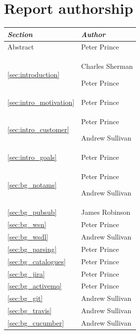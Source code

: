 \documentclass[a4paper, 12pt, twoside]{article}
\newcommand*{\fullref}[1]{\ref{#1} \nameref{#1}}
\begin{document}
\newpage

\sloppy
\printbibliography

\appendix

\section{Report authorship}

\begin{tabularx}{\textwidth}{|X|X|} \hline
  \emph{Section}                         & \emph{Author}                      \\ \hline
  Abstract         & Peter Prince                       \\ \hline
  \fullref{sec:introduction}             & Charles Sherman\par Peter Prince   \\ \hline
  \fullref{sec:intro_motivation}         & Peter Prince                       \\
  \fullref{sec:intro_customer}           & Peter Prince\par Andrew Sullivan  \\
  \fullref{sec:intro_goals}              & Peter Prince                       \\ \hline
  \fullref{sec:bg_notams}                & Peter Prince\par Andrew Sullivan   \\
  \fullref{sec:bg_pubsub}                & James Robinson                     \\
  \fullref{sec:bg_wsn}                   & Peter Prince                       \\
  \fullref{sec:bg_wsdl}						& Andrew Sullivan 				\\
  \fullref{sec:bg_parsing}               & Peter Prince                       \\
  \fullref{sec:bg_catalogues}            & Peter Prince                       \\
  \fullref{sec:bg_jira}                  & Peter Prince                       \\
  \fullref{sec:bg_activemq}              & Peter Prince                       \\
  \fullref{sec:bg_git}                   & Andrew Sullivan                    \\
  \fullref{sec:bg_travis}                & Andrew Sullivan                    \\
  \fullref{sec:bg_cucumber}              & Andrew Sullivan                    \\

\end{tabularx}
\end{document}
